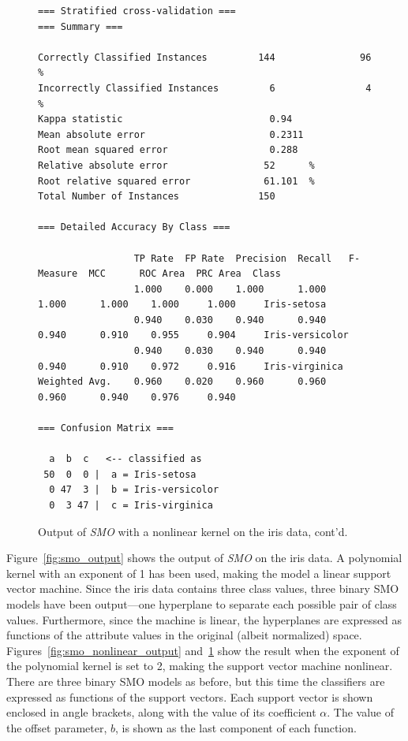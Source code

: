 \begin{figure}[!th]
\begin{mdframed}[innermargin=-1.0cm]
\begin{Verbatim}[fontsize=\tiny]
=== Stratified cross-validation ===
=== Summary ===

Correctly Classified Instances         144               96      %
Incorrectly Classified Instances         6                4      %
Kappa statistic                          0.94  
Mean absolute error                      0.2311
Root mean squared error                  0.288 
Relative absolute error                 52      %
Root relative squared error             61.101  %
Total Number of Instances              150     

=== Detailed Accuracy By Class ===

                 TP Rate  FP Rate  Precision  Recall   F-Measure  MCC      ROC Area  PRC Area  Class
                 1.000    0.000    1.000      1.000    1.000      1.000    1.000     1.000     Iris-setosa
                 0.940    0.030    0.940      0.940    0.940      0.910    0.955     0.904     Iris-versicolor
                 0.940    0.030    0.940      0.940    0.940      0.910    0.972     0.916     Iris-virginica
Weighted Avg.    0.960    0.020    0.960      0.960    0.960      0.940    0.976     0.940     

=== Confusion Matrix ===

  a  b  c   <-- classified as
 50  0  0 |  a = Iris-setosa
  0 47  3 |  b = Iris-versicolor
  0  3 47 |  c = Iris-virginica
\end{Verbatim}
\end{mdframed}
\caption{\label{fig:smo_nonlinear_cont} Output of \textit{SMO} with a nonlinear kernel on the iris data, cont'd.}
\end{figure}

Figure~\ref{fig:smo_output} shows the output of \textit{SMO} on the
iris data. A polynomial kernel with an exponent of 1 has been used,
making the model a linear support vector machine. Since the iris data
contains three class values, three binary SMO models have been
output---one hyperplane to separate each possible pair of class
values. Furthermore, since the machine is linear, the hyperplanes are
expressed as functions of the attribute values in the original (albeit
normalized) space. Figures~\ref{fig:smo_nonlinear_output} and~\ref{fig:smo_nonlinear_cont} show the result when the exponent of the
polynomial kernel is set to 2, making the support vector machine
nonlinear. There are three binary SMO models as before, but this time
the classifiers are expressed as functions of the support
vectors. Each support vector is shown enclosed in angle brackets,
along with the value of its coefficient $\alpha$. The value of the
offset parameter, $b$, is shown
as the last component of each function.

